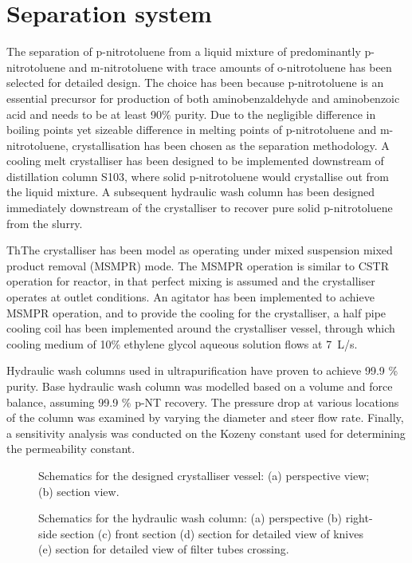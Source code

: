 \section*{Separation system}

The separation of p-nitrotoluene from a liquid mixture of predominantly p-nitrotoluene and m-nitrotoluene with trace amounts of o-nitrotoluene has been selected for detailed design. The choice has been because p-nitrotoluene is an essential precursor for production of both aminobenzaldehyde and aminobenzoic acid and needs to be at least 90\% purity. Due to the negligible difference in boiling points yet sizeable difference in melting points of p-nitrotoluene and m-nitrotoluene, crystallisation has been chosen as the separation methodology. A cooling melt crystalliser has been designed to be implemented downstream of distillation column S103, where solid p-nitrotoluene would crystallise out from the liquid mixture. A subsequent hydraulic wash column has been designed immediately downstream of the crystalliser to recover pure solid p-nitrotoluene from the slurry. 


ThThe crystalliser has been model as operating under mixed suspension mixed product removal (MSMPR) mode. The MSMPR operation is similar to CSTR operation for reactor, in that perfect mixing is assumed and the crystalliser operates at outlet conditions. An agitator has been implemented to achieve MSMPR operation, and to provide the cooling for the crystalliser, a half pipe cooling coil has been implemented around the crystalliser vessel, through which cooling medium of 10\% ethylene glycol aqueous solution flows at \SI{7}{L/s}. 


Hydraulic wash columns used in ultrapurification have proven to achieve 99.9 \% purity. Base hydraulic wash column was modelled based on a volume and force balance, assuming 99.9 \% p-NT recovery. The pressure drop at various locations of the column was examined by varying the diameter and steer flow rate. Finally, a sensitivity analysis was conducted on the Kozeny constant used for determining the permeability constant. 

\begin{figure}[h]
    \centering
    
    \caption{Schematics for the designed crystalliser vessel: (a) perspective view; (b) section view.}
    \label{fig:crystalliser schematic executive}
\end{figure}

\begin{figure}[h]
    \centering
    
    \caption{Schematics for the hydraulic wash column: (a) perspective (b) right-side section (c) front section (d) section for detailed view of knives (e) section for detailed view of filter tubes crossing.}
    \label{fig:wash column schematic executive}
\end{figure}